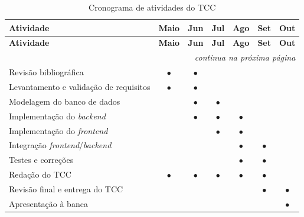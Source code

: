 \documentclass[12pt,a4paper,oneside]{abntspiifac}
\begin{document}
\begin{longtable}{p{6.5cm}*{6}{c}}
\caption{Cronograma de atividades do TCC}
\label{qua:cronograma} \\
\toprule
\textbf{Atividade} & \textbf{Maio} & \textbf{Jun} & \textbf{Jul} & \textbf{Ago} & \textbf{Set} & \textbf{Out} \\
\midrule
\endfirsthead
\toprule
\textbf{Atividade} & \textbf{Maio} & \textbf{Jun} & \textbf{Jul} & \textbf{Ago} & \textbf{Set} & \textbf{Out} \\
\midrule
\endhead
\midrule
\multicolumn{7}{r}{\small\textit{continua na próxima página}} \\
\endfoot
\bottomrule
\endlastfoot
Revisão bibliográfica                    & $\bullet$ & $\bullet$ &            &            &            &            \\[3pt]
Levantamento e validação de requisitos   & $\bullet$ & $\bullet$ &            &            &            &            \\[3pt]
Modelagem do banco de dados              &           & $\bullet$ & $\bullet$  &            &            &            \\[3pt]
Implementação do \textit{backend}        &           & $\bullet$ & $\bullet$  & $\bullet$  &            &            \\[3pt]
Implementação do \textit{frontend}       &           &           & $\bullet$  & $\bullet$  &            &            \\[3pt]
Integração \textit{frontend}/\textit{backend} &      &           &            & $\bullet$  & $\bullet$  &            \\[3pt]
Testes e correções                       &           &           &            & $\bullet$  & $\bullet$  &            \\[3pt]
Redação do TCC                           & $\bullet$ & $\bullet$ & $\bullet$  & $\bullet$  & $\bullet$  &            \\[3pt]
Revisão final e entrega do TCC           &           &           &            &            & $\bullet$  & $\bullet$  \\[3pt]
Apresentação à banca                     &           &           &            &            &            & $\bullet$  \\
\end{longtable}



\postextual

\end{document}

